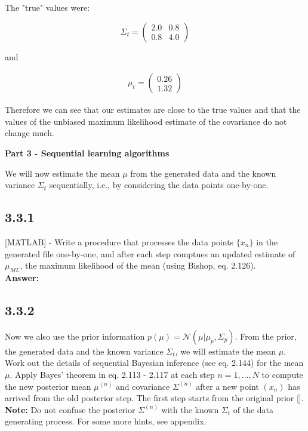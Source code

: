 \documentclass[a4paper]{article}
\begin{document}
The "true" values were:

\[ \Sigma_t = \left( \begin{array}{cc}
2.0 & 0.8  \\
0.8 & 4.0 \end{array} \right)\] 

and 

\begin{align*}
	\mu_t = \begin{pmatrix}0.26 \\ 1.32 \end{pmatrix}
\end{align*}

\vspace{1em}

Therefore we can see that our estimates are close to the true values and that the values of the unbiased maximum likelihood estimate of the covariance do not change much.

\vspace{1em}

\textbf{Part 3 - Sequential learning algorithms}

We will now estimate the mean $\mu$ from the generated data and the known variance $\Sigma_t$ sequentially, i.e., by considering the data points one-by-one.

\subsection*{3.3.1}

[MATLAB] - Write a procedure that processes the data points $\{ x_n \}$ in the generated file one-by-one, and after each step comptues an updated estimate of $\mu_{ML}$, the maximum likelihood of the mean (using Bishop, eq. 2.126).\\


\textbf{Answer:}\\





\subsection*{3.3.2}


Now we also use the prior information $p(\mu) = \mathcal{N}(\mu | \mu_p, \Sigma_p)$. From the prior, the generated data and the known variance $\Sigma_t$, we will estimate the mean $\mu$.\\

Work out the details of sequential Bayesian inference (see eq. 2.144) for the mean $\mu$. Apply Bayes' theorem in eq. 2.113 - 2.117 at each step $n = 1, ..., N$ to compute the new posterior mean $\mu^{(n)}$ and covariance $\Sigma^{(n)}$ after a new point $(x_n)$ has arrived from the old posterior step. The first step starts from the original prior \ref{}.\\
\textbf{Note:} Do not confuse the posterior $\Sigma^{(n)}$ with the known $\Sigma_t$ of the data generating process. For some more hints, see appendix.\\
\end{document}
